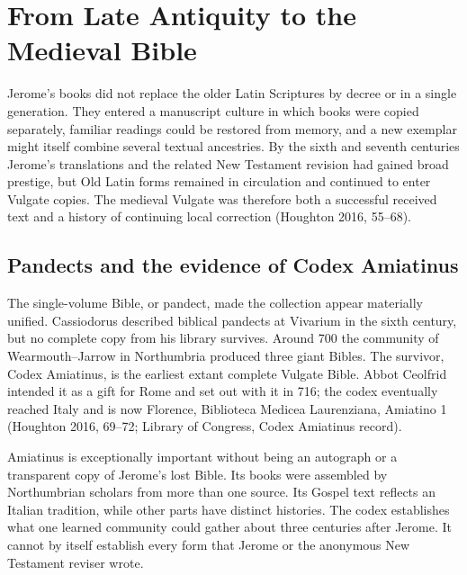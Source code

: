 \section{From Late Antiquity to the Medieval Bible}

Jerome's books did not replace the older Latin Scriptures by decree or in a single generation. They entered a manuscript culture in which books were copied separately, familiar readings could be restored from memory, and a new exemplar might itself combine several textual ancestries. By the sixth and seventh centuries Jerome's translations and the related New Testament revision had gained broad prestige, but Old Latin forms remained in circulation and continued to enter Vulgate copies. The medieval Vulgate was therefore both a successful received text and a history of continuing local correction (Houghton 2016, 55--68).

\subsection{Pandects and the evidence of Codex Amiatinus}

The single-volume Bible, or pandect, made the collection appear materially unified. Cassiodorus described biblical pandects at Vivarium in the sixth century, but no complete copy from his library survives. Around 700 the community of Wearmouth--Jarrow in Northumbria produced three giant Bibles. The survivor, Codex Amiatinus, is the earliest extant complete Vulgate Bible. Abbot Ceolfrid intended it as a gift for Rome and set out with it in 716; the codex eventually reached Italy and is now Florence, Biblioteca Medicea Laurenziana, Amiatino 1 (Houghton 2016, 69--72; Library of Congress, Codex Amiatinus record).

Amiatinus is exceptionally important without being an autograph or a transparent copy of Jerome's lost Bible. Its books were assembled by Northumbrian scholars from more than one source. Its Gospel text reflects an Italian tradition, while other parts have distinct histories. The codex establishes what one learned community could gather about three centuries after Jerome. It cannot by itself establish every form that Jerome or the anonymous New Testament reviser wrote.


